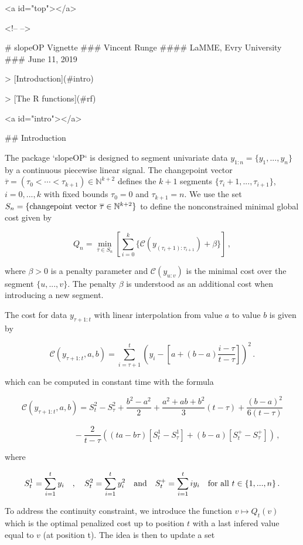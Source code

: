 <a id="top"></a>

<!-- 
--> 

# slopeOP Vignette
### Vincent Runge
#### LaMME, Evry University
### June 11, 2019

> [Introduction](#intro)

> [The R functions](#rf)

<a id="intro"></a>

## Introduction

The package `slopeOP` is designed to segment univariate data $y_{1:n} = \{y_1,...,y_n\}$ by a continuous piecewise linear signal. The changepoint vector $\overline{\tau} = (\tau_0 < \cdots < \tau_{k+1}) \in \mathbb{N}^{k+2}$ defines the $k+1$ segments $\{\tau_i+1,...,\tau_{i+1}\}$, $i = 0,...,k$ with fixed bounds $\tau_0 = 0$ and  $\tau_{k+1} = n$. We use the set $S_n = \{\hbox{changepoint vector } \overline{\tau} \in \mathbb{N}^{k+2}\}$ to define the nonconstrained minimal global cost given by

$$Q_n = \min_{\overline{\tau} \in S_n}\left[ \sum_{i=0}^{k}\lbrace \mathcal{C}(y_{(\tau_i+1):\tau_{i+1}}) + \beta \rbrace \right]\,,$$

where $\beta > 0$ is a penalty parameter and $\mathcal{C}(y_{u:v})$ is the minimal cost over the segment $\{u,...,v\}$. The penalty $\beta$ is understood as an additional cost when introducing a new segment. 

The cost for data $y_{\tau+1:t}$ with linear interpolation from value $a$ to value $b$ is given by

$$
\mathcal{C}(y_{\tau+1:t},a,b) = \sum_{i=\tau+1}^{t}\left(y_i - [a + (b-a)\frac{i-\tau}{t-\tau}]\right)^2\,.
$$

which can be computed in constant time with the formula 

$$\mathcal{C}(y_{\tau+1:t},a,b) = S_{t}^2 - S_{\tau}^2 +\frac{b^2-a^2}{2} + \frac{a^2 + ab +b^2}{3}(t-\tau) + \frac{(b-a)^2}{6(t-\tau)}$$

$$\quad\quad\quad\quad\quad\quad - \frac{2}{t-\tau} \left( (ta-b\tau)[S_{t}^1 - S_{\tau}^1] + (b-a)[S_{t}^+ - S_{\tau}^+]\right)\,,$$

where

$$
S^1_t = \sum_{i=1}^t y_i\quad , \quad S^2_t = \sum_{i=1}^t y_i^2\quad \hbox{and} \quad S^+_t = \sum_{i=1}^t iy_i\quad \hbox{for all} \,\, t \in \{1,...,n\}\,.
$$

To address the continuity constraint, we introduce the function $v \mapsto Q_t(v)$ which is the optimal penalized cost up to position $t$ with a last infered value equal to $v$ (at position t). The idea is then to update a set

